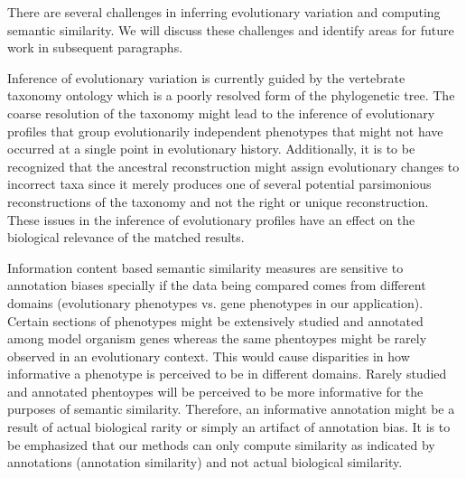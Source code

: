 \documentclass{article}
\begin{document}


There are several challenges in inferring evolutionary variation and computing semantic similarity. We will discuss these challenges and identify areas for future work in subsequent paragraphs. 

Inference of evolutionary variation is currently guided by the vertebrate taxonomy ontology which is a poorly resolved form of the phylogenetic tree. The coarse resolution of the taxonomy might lead to the inference of evolutionary profiles that group evolutionarily independent phenotypes that might not have occurred at a single point in evolutionary history. Additionally, it is to be recognized that the ancestral reconstruction might assign evolutionary changes to incorrect taxa since it merely produces one of several potential parsimonious reconstructions of the taxonomy and not the right or unique reconstruction. These issues in the inference of evolutionary profiles have an effect on the biological relevance of the matched results. 

Information content based semantic similarity measures are sensitive to annotation biases specially if the data being compared comes from different domains (evolutionary phenotypes vs. gene phenotypes in our application). Certain sections of phenotypes might be extensively studied and annotated among model organism genes whereas the same phentoypes might be rarely observed in an evolutionary context. This would cause disparities in how informative a phenotype is perceived to be in different domains. Rarely studied and annotated phentoypes will be perceived to be more informative for the purposes of semantic similarity. Therefore, an informative annotation might be a result of actual biological rarity or simply an artifact of annotation bias. It is to be emphasized that our methods can only compute similarity as indicated by annotations (annotation similarity) and not actual biological similarity.
\end{document}
